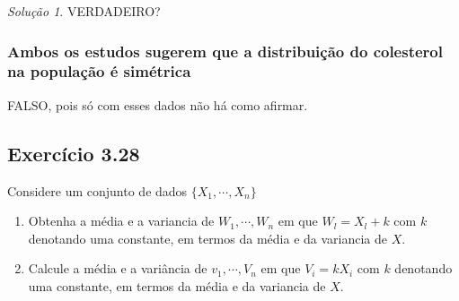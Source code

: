 \documentclass[
]{latex/krantz}
\providecommand{\tightlist}{%
  \setlength{\itemsep}{0pt}\setlength{\parskip}{0pt}}
\theoremstyle{definition}
\theoremstyle{definition}
\theoremstyle{definition}
\theoremstyle{definition}
\theoremstyle{remark}
\newtheorem*{solution}{Solução}
\begin{document}
\begin{solution}
VERDADEIRO?

\hypertarget{ambos-os-estudos-sugerem-que-a-distribuiuxe7uxe3o-do-colesterol-na-populauxe7uxe3o-uxe9-simuxe9trica}{%
\subsubsection*{Ambos os estudos sugerem que a distribuição do colesterol na população é simétrica}\label{ambos-os-estudos-sugerem-que-a-distribuiuxe7uxe3o-do-colesterol-na-populauxe7uxe3o-uxe9-simuxe9trica}}

FALSO, pois só com esses dados não há como afirmar.

\end{solution}

\hypertarget{exr3-28}{%
\subsection*{Exercício 3.28}\label{exr3-28}}

Considere um conjunto de dados \(\{X_{1}, \cdots , X_{n}\}\)

\begin{enumerate}
\def\labelenumi{\alph{enumi})}
\tightlist
\item
  Obtenha a média e a variancia de \(W_{1}, \cdots , W_{n}\) em que \(W_{l} = X_{l} + k\) com \(k\) denotando uma constante, em termos da média e da variancia de \(X\).
\item
  Calcule a média e a variância de \(v_{1}, \cdots , V_{n}\) em que \(V_{i} = kX_{i}\) com \(k\) denotando uma constante, em termos da média e da variancia de \(X\).
\end{enumerate}
\end{document}
